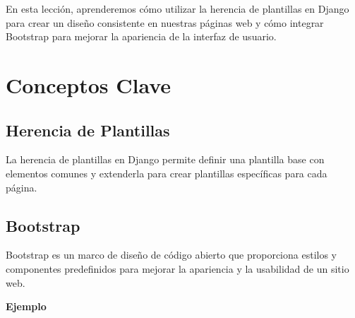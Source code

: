 \documentclass[
  a4paper,
  DIV=11,
  numbers=noendperiod,
  onepage,
  openany]{scrreprt}
\begin{document}
En esta lección, aprenderemos cómo utilizar la herencia de plantillas en
Django para crear un diseño consistente en nuestras páginas web y cómo
integrar Bootstrap para mejorar la apariencia de la interfaz de usuario.

\section{Conceptos Clave}\label{conceptos-clave-29}

\subsection{Herencia de Plantillas}\label{herencia-de-plantillas}

La herencia de plantillas en Django permite definir una plantilla base
con elementos comunes y extenderla para crear plantillas específicas
para cada página.

\subsection{Bootstrap}\label{bootstrap}

Bootstrap es un marco de diseño de código abierto que proporciona
estilos y componentes predefinidos para mejorar la apariencia y la
usabilidad de un sitio web.

\textbf{Ejemplo}
\end{document}
